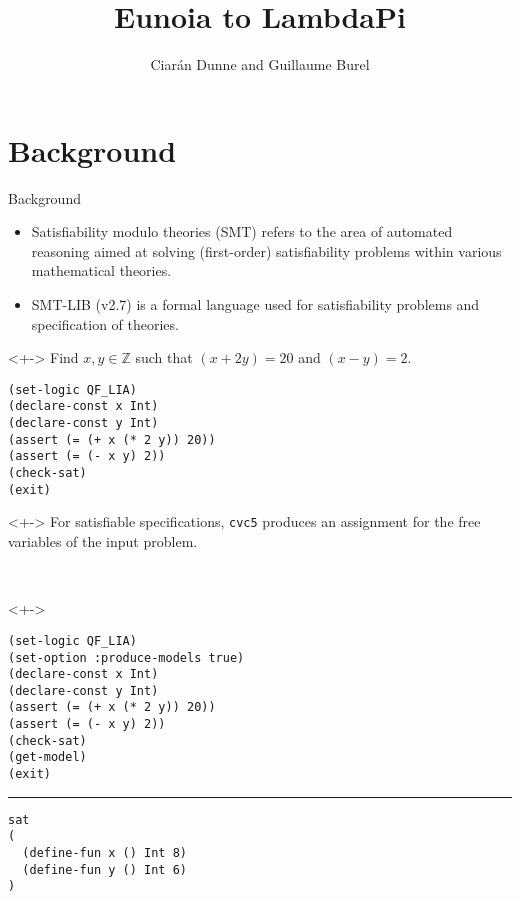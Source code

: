 \documentclass[lualatex, 12pt, handout]{beamer}
\title{Eunoia to LambdaPi}
\author{Ciarán Dunne and Guillaume Burel}
\institute{ENS Paris-Saclay, INRIA}
\begin{document}
\frame[plain]{\titlepage}

\section{Background}

\begin{frame}[fragile]{Background}
	\begin{itemize}
		\item<+-> \alert{Satisfiability modulo theories} (SMT) refers to the area
		      of automated reasoning aimed at solving (first-order) satisfiability
		      problems within various mathematical theories.
		\item<+-> \alert{SMT-LIB} (v2.7) is a formal language
		      used for satisfiability problems and specification
		      of theories.
	\end{itemize}
	\begin{uncoverenv}<+->
		\exxample
		Find $x,y ∈ ℤ$ such that $(x + 2y) = 20$ and $(x - y) = 2$.
		\begin{lstlisting}
(set-logic QF_LIA)
(declare-const x Int)
(declare-const y Int)
(assert (= (+ x (* 2 y)) 20))
(assert (= (- x y) 2))
(check-sat)
(exit)\end{lstlisting}
	\end{uncoverenv}
\end{frame}

\begin{frame}[fragile]
	\begin{uncoverenv}<+->
		For satisfiable specifications,
		\texttt{cvc5} produces an \alert{assignment} for the
		free variables of the input problem.
	\end{uncoverenv}
	\\[3mm]
	\begin{uncoverenv}<+->
		\exxample
		\begin{lstlisting}
(set-logic QF_LIA)
(set-option :produce-models true)
(declare-const x Int)
(declare-const y Int)
(assert (= (+ x (* 2 y)) 20))
(assert (= (- x y) 2))
(check-sat)
(get-model)
(exit)\end{lstlisting}
		\hrule
		\begin{lstlisting}
sat
(
  (define-fun x () Int 8)
  (define-fun y () Int 6)
)\end{lstlisting}
	\end{uncoverenv}
\end{frame}
\end{document}
